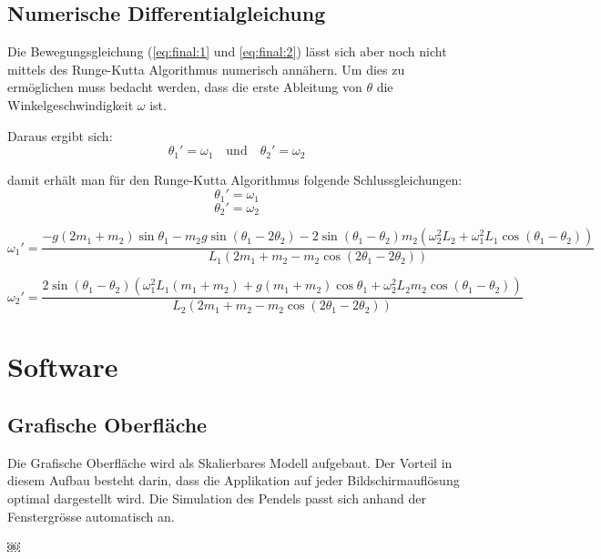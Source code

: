 \documentclass[12pt]{article}
\numberwithin{equation}{subsection}
\begin{document}
\subsection{Numerische Differentialgleichung}
Die Bewegungsgleichung (\ref{eq:final:1} und \ref{eq:final:2}) lässt sich aber noch nicht mittels des Runge-Kutta Algorithmus numerisch annähern. Um dies zu ermöglichen muss bedacht werden, dass die erste Ableitung von $\theta$ die Winkelgeschwindigkeit $\omega$ ist.

Daraus ergibt sich:
\begin{equation*}
	\theta_1' = \omega_1 \quad \text{und} \quad \theta_2' = \omega_2
\end{equation*}

damit erhält man für den Runge-Kutta Algorithmus folgende Schlussgleichungen:
\begin{equation} \label{eq:rk:1}
	\theta_1' = \omega_1
\end{equation}
\begin{equation} \label{eq:rk:2}
	\theta_2' = \omega_2
\end{equation}

\begin{equation} \label{eq:rk:3}
	\omega_1' = \frac{-g(2m_1+m_2)\sin\theta_1 - m_2 g \sin(\theta_1 - 2\theta_2) -2\sin(\theta_1 - \theta_2)m_2(\omega_2^2 L_2 + \omega_1^2 L_1\cos(\theta_1 - \theta_2))}
	{L_1(2m_1 + m_2 - m_2 \cos(2\theta_1 - 2\theta_2))}
\end{equation}

\begin{equation} \label{eq:rk:4}
	\omega_2' = \frac{2\sin(\theta_1 - \theta_2)(\omega_1^2 L_1(m_1 + m_2) + g(m_1 + m_2)\cos\theta_1 + \omega_2^2 L_2 m_2 \cos(\theta_1 - \theta_2))}
	{L_2 (2m_1 + m_2 - m_2 \cos(2 \theta_1 - 2\theta_2))}
\end{equation}

\newpage
\section{Software}
\subsection{Grafische Oberfläche}
Die Grafische Oberfläche wird als Skalierbares Modell aufgebaut. Der Vorteil in diesem Aufbau besteht darin, dass die Applikation auf jeder Bildschirmauflösung optimal dargestellt wird. Die Simulation des Pendels passt sich anhand der Fenstergrösse automatisch an.

\newpage
￼\listoffigures
\listoftables

\newpage
\nocite{*}


\end{document}
